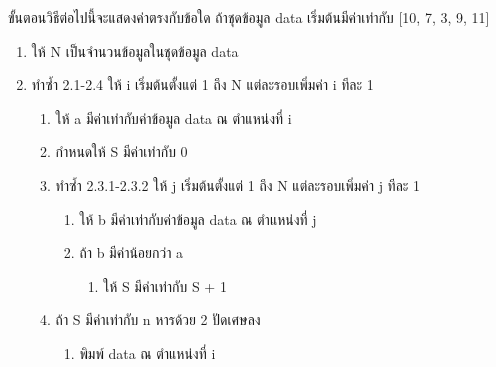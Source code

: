 \question ขั้นตอนวิธีต่อไปนี้จะแสดงค่าตรงกับข้อใด ถ้าชุดข้อมูล data เริ่มต้นมีค่าเท่ากับ [10, 7, 3, 9, 11]
\begin{pseudocode}
\begin{enumerate}
    \item ให้ N เป็นจำนวนข้อมูลในชุดข้อมูล data 
    \item ทำซ้ำ 2.1-2.4 ให้ i เริ่มต้นตั้งแต่ 1 ถึง N แต่ละรอบเพิ่มค่า i ทีละ 1 
    \begin{enumerate}
        \item ให้ a มีค่าเท่ากับค่าข้อมูล data ณ ตำแหน่งที่ i 
        \item กำหนดให้ S มีค่าเท่ากับ 0
        \item ทำซ้ำ 2.3.1-2.3.2 ให้ j เริ่มต้นตั้งแต่ 1 ถึง N แต่ละรอบเพิ่มค่า j ทีละ 1 
        \begin{enumerate}
            \item ให้ b มีค่าเท่ากับค่าข้อมูล data ณ ตำแหน่งที่ j
            \item ถ้า b มีค่าน้อยกว่า a
            \begin{enumerate}
                \item ให้ S มีค่าเท่ากับ S + 1
            \end{enumerate}
        \end{enumerate}
        \item ถ้า S มีค่าเท่ากับ n หารด้วย 2 ปัดเศษลง
        \begin{enumerate}
            \item พิมพ์ data ณ ตำแหน่งที่ i
        \end{enumerate}
    \end{enumerate}
\end{enumerate}
\end{pseudocode}
